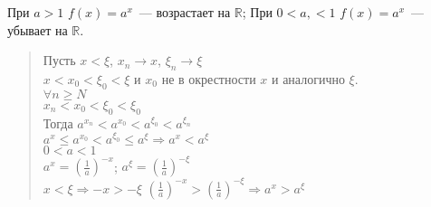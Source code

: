 \documentclass{article}
\begin{document}
	\begin{statement}
		При $a > 1$ $f(x) = a^x$~--- возрастает на $\mathbb{R}$; При $0 < a,< 1$ $f(x) = a^x$~--- убывает на $\mathbb{R}$.
	\end{statement}
	\begin{quote}
		Пусть $x < \xi$, $x_n \rightarrow x$, $\xi_n \rightarrow \xi$ \\
		$x < x_0 < \xi_0 < \xi$ и $x_0$ не в окрестности $x$ и аналогично $\xi$. \\
		$\forall n \geqslant N$ \\
		$x_n < x_0 < \xi_0 < \xi_0$ \\
		Тогда $a^{x_n} < a^{x_0} < a^{\xi_0} < a^{\xi_n}$ \\
		$a^{x} \leqslant a^{x_0} < a^{\xi_0} \leqslant a^{\xi} \Rightarrow a^x < a^{\xi}$ \\
		$0 < a < 1$ \\
		$a^x = (\frac{1}{a})^{-x}$; $a^{\xi} = (\frac{1}{a})^{-\xi}$ \\
		$x < \xi \Rightarrow -x > -\xi$ $(\frac{1}{a})^{-x} > (\frac{1}{a})^{-\xi} \Rightarrow a^x > a^{\xi}$
	\end{quote}
\end{document}
